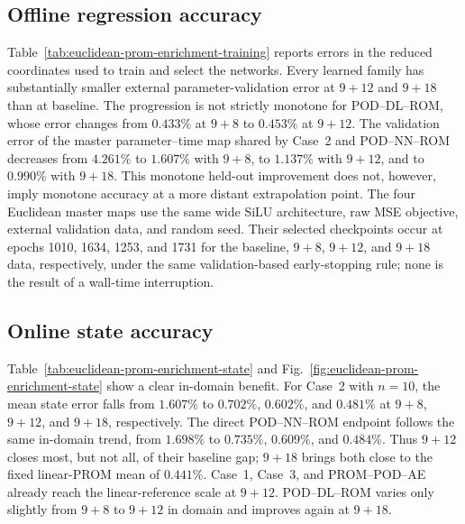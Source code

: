 \documentclass[11pt]{article}
\begin{document}
\subsection{Offline regression accuracy}
Table~\ref{tab:euclidean-prom-enrichment-training} reports errors in the
reduced coordinates used to train and select the networks.  Every learned
family has substantially smaller external parameter-validation error at
$9+12$ and $9+18$ than at baseline.  The progression is not strictly
monotone for POD--DL--ROM, whose error changes from $0.433\%$ at $9+8$ to
$0.453\%$ at $9+12$.  The validation error of the master parameter--time map shared by
Case~2 and POD--NN--ROM decreases from $4.261\%$ to $1.607\%$ with $9+8$,
to $1.137\%$ with $9+12$, and to $0.990\%$ with $9+18$.  This monotone
held-out improvement does not,
however, imply monotone accuracy at a more distant extrapolation point.
The four Euclidean master maps use the same wide SiLU architecture, raw MSE
objective, external validation data, and random seed.  Their selected
checkpoints occur at epochs 1010, 1634, 1253, and 1731 for the baseline,
$9+8$, $9+12$, and $9+18$ data, respectively, under the same
validation-based early-stopping rule; none is the result of a wall-time
interruption.

\begin{table}[H]
\centering
\caption{Training and held-out parameter-validation coefficient errors across
the Euclidean-POD PROM enrichment ladder.  The master map supplies both the
Case--2 secondary tail and the POD--NN--ROM direct prediction.}
\label{tab:euclidean-prom-enrichment-training}
\resizebox{\textwidth}{!}{}
\end{table}

\subsection{Online state accuracy}
Table~\ref{tab:euclidean-prom-enrichment-state} and
Fig.~\ref{fig:euclidean-prom-enrichment-state} show a clear in-domain benefit.
For Case~2 with $n=10$, the mean state error falls from $1.607\%$ to
$0.702\%$, $0.602\%$, and $0.481\%$ at $9+8$, $9+12$, and $9+18$,
respectively.  The direct POD--NN--ROM endpoint follows the same in-domain
trend, from $1.698\%$ to $0.735\%$, $0.609\%$, and $0.484\%$.  Thus
$9+12$ closes most, but not all, of their baseline gap; $9+18$ brings both
close to the fixed linear-PROM mean of $0.441\%$.  Case~1, Case~3, and
PROM--POD--AE already reach the linear-reference scale at $9+12$.
POD--DL--ROM varies only slightly from $9+8$ to $9+12$ in domain and improves
again at $9+18$.
\end{document}
